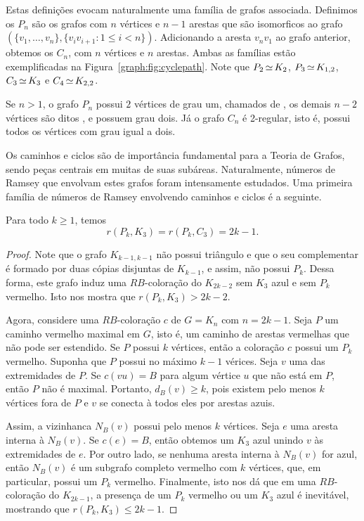 Estas definições evocam naturalmente uma família de grafos associada. Definimos os  $P_n$ são os grafos com $n$ vértices e $n-1$ arestas que são isomorficos ao grafo $(\{v_1,\dots,v_n\}, \{v_iv_{i+1}: 1\leq i < n\})$. Adicionando a aresta $v_nv_1$ ao grafo anterior, obtemos os  $C_n$, com $n$ vértices e $n$ arestas. Ambas as famílias estão exemplificadas na Figura~\ref{graph:fig:cyclepath}.
Note que $P_2 \operatorname{\simeq} K_2$, $P_3 \operatorname{\simeq} K_{1,2}$, $C_3 \operatorname{\simeq} K_3$ e $C_4 \operatorname{\simeq} K_{2,2}$.

Se $n > 1$, o grafo $P_n$ possui $2$ vértices de grau um, chamados de , os demais $n-2$ vértices são ditos , e possuem grau dois. Já o grafo $C_n$ é 2-regular, isto é, possui todos os vértices com grau igual a dois.

Os caminhos e ciclos são de importância fundamental para a Teoria de Grafos, sendo peças centrais em muitas de suas subáreas. Naturalmente, números de Ramsey que envolvam estes grafos foram intensamente estudados. Uma primeira família de números de Ramsey envolvendo caminhos e ciclos é a seguinte.

\begin{proposition}
\label{graph:thm:rpt}  Para todo $k \geq 1$, temos
\[r(P_k, K_3) = r(P_k, C_3) = 2k - 1.\]
\end{proposition}
\begin{proof}
Note que o grafo $K_{k-1,k-1}$ não possui triângulo e que o seu complementar é formado por duas cópias disjuntas de $K_{k-1}$, e assim, não possui $P_k$. Dessa forma, este grafo induz uma $RB$-coloração do $K_{2k - 2}$ sem $K_3$ azul e sem $P_k$ vermelho. Isto nos mostra que $r(P_k, K_3) > 2k - 2$.

Agora, considere uma $RB$-coloração $c$ de $G=K_n$ com $n = 2k-1$. Seja $P$ um caminho vermelho maximal em $G$, isto é, um caminho de arestas vermelhas que não pode ser estendido. Se $P$ possui $k$ vértices, então a coloração $c$ possui um $P_k$ vermelho. Suponha que $P$ possui no máximo $k-1$ vérices. Seja $v$ uma das extremidades de $P$. Se $c(vu) = B$ para algum vértice $u$ que não está em $P$, então $P$ não é maximal. Portanto, $d_B(v) \geq k$, pois existem pelo menos $k$ vértices fora de $P$ e $v$ se conecta à todos eles por arestas azuis.

Assim, a vizinhanca $N_B(v)$ possui pelo menos $k$ vértices. Seja $e$ uma aresta interna à $N_B(v)$. Se $c(e) = B$, então obtemos um $K_3$ azul unindo $v$ às extremidades de $e$. Por outro lado, se nenhuma aresta interna à $N_B(v)$ for azul, então $N_B(v)$ é um subgrafo completo vermelho com $k$ vértices, que, em particular, possui um $P_k$ vermelho. Finalmente, isto nos dá que em uma $RB$-coloração do $K_{2k-1}$, a presença de um $P_k$ vermelho ou um $K_3$ azul é inevitável, mostrando que $r(P_k, K_3) \leq 2k-1$.
\end{proof}

